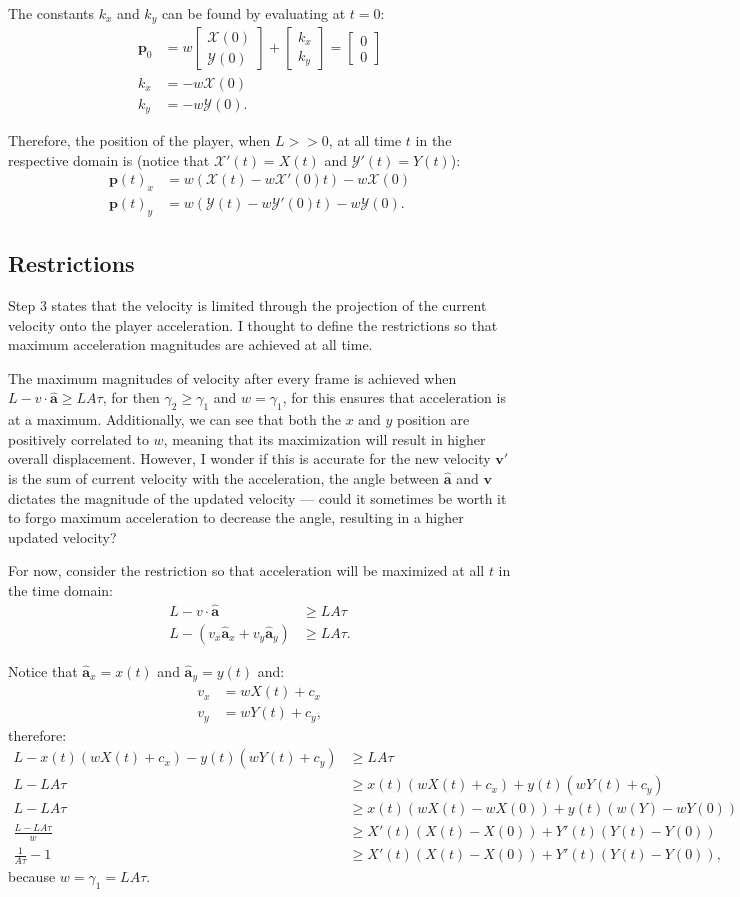 \documentclass[a4paper,11pt]{article}
\newcommand{\tvec}[1]{\boldsymbol{#1}}
\newcommand{\tunit}[1]{\boldsymbol{\hat{#1}}}
\newcommand{\tv}{\tvec{v}}
\newcommand{\tp}{\tvec{p}}
\newcommand{\tpar}[2]{\begin{bmatrix}#1\\#2 \end{bmatrix}}
\newcommand{\tfx}{\mathcal{X}}
\newcommand{\tfy}{\mathcal{Y}}
\begin{document}
The constants $k_x$ and $k_y$ can be found by evaluating at $t=0$:
\begin{align*}
    \tp_0 &= w \tpar{\tfx(0)}{\tfy(0)} + \tpar{k_x}{k_y} = \tpar{0}{0}\\
    k_x &= -w\tfx(0)\\
    k_y &= -w\tfy(0).
\end{align*}

Therefore, the position of the player, when $L >> 0$, at all time $t$ in the respective domain is (notice that $\tfx'(t) = X(t)$ and $\tfy'(t) = Y(t)$):
\begin{align*}
 \tp(t)_x &= w(\tfx(t) - w\tfx'(0)t) - w\tfx(0)\\
 \tp(t)_y &= w(\tfy(t) - w\tfy'(0)t) - w\tfy(0).
\end{align*}

\subsection{Restrictions}
Step 3 states that the velocity is limited through the projection of the current velocity onto the player acceleration. I thought to define the restrictions so that maximum acceleration magnitudes are achieved at all time.

The maximum magnitudes of velocity after every frame is achieved when $L- v \cdot \tunit{a} \ge LA\tau$, for then $\gamma_2 \ge \gamma_1$ and $w = \gamma_1$, for this ensures that acceleration is at a maximum. Additionally, we can see that both the $x$ and $y$ position are positively correlated to $w$, meaning that its maximization will result in higher overall displacement. However, I wonder if this is accurate for the new velocity $\tv'$ is the sum of current velocity with the acceleration, the angle between $\tunit{a}$ and $\tv$ dictates the magnitude of the updated velocity --- could it sometimes be worth it to forgo maximum acceleration to decrease the angle, resulting in a higher updated velocity?

For now, consider the restriction so that acceleration will be maximized at all $t$ in the time domain:
\begin{align*}
    L - v \cdot \tunit{a} &\ge LA\tau\\
    L - (v_x \tunit{a}_x + v_y \tunit{a}_y) &\ge LA\tau.
\end{align*}

Notice that $\tunit{a}_x = x(t)$ and $\tunit{a}_y = y(t)$ and:
\begin{align*}
    v_x &= wX(t) + c_x\\
    v_y &= wY(t) + c_y,
\end{align*}
therefore:
\begin{align*}
 L - x(t)(wX(t)+c_x) - y(t)(wY(t)+c_y) &\ge LA\tau\\
    L - LA\tau &\ge x(t)(wX(t)+c_x) + y(t)(wY(t)+c_y)\\
    L - LA\tau &\ge x(t)(wX(t)-wX(0)) + y(t)(w(Y)-wY(0))\\
    \frac{L - LA\tau}{w} &\ge X'(t)(X(t)-X(0)) + Y'(t)(Y(t)-Y(0))\\
    \frac{1}{A\tau} - 1 &\ge X'(t)(X(t)-X(0)) + Y'(t)(Y(t)-Y(0)),
\end{align*}
because $w=\gamma_1=LA\tau$.
\end{document}

